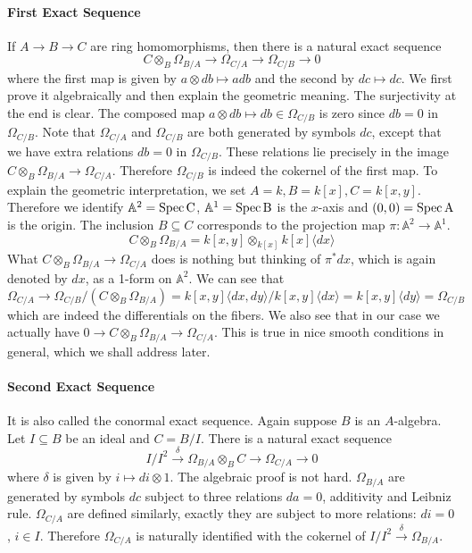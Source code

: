 \documentclass[12pt]{article}
\theoremstyle{plain}
\theoremstyle{definition}
\newcommand{\IA}{\mathbb{A}}
\newcommand{\Spec}{\rm Spec\,}
\newcommand\tensor{{\otimes}}
\newcommand{\<}{\langle}
\renewcommand{\>}{\rangle}
\newcommand{\Ohm}{\Omega}
\begin{document}
\paragraph{First Exact Sequence} If $A \to B \to C$ are ring homomorphisms, then there is a natural exact sequence 
$$ C \tensor_B \Ohm_{B/A} \to \Ohm_{C/A} \to \Ohm_{C/B} \to 0 $$
where the first map is given by $a \tensor db \mapsto a db$ and the second by $dc \mapsto dc$. We first prove it algebraically and then explain the geometric meaning. 
The surjectivity at the end is clear. The composed map $a \tensor db \mapsto db \in \Ohm_{C/B}$ is zero since $db = 0$ in $\Ohm_{C/B}$. Note that $\Ohm_{C/A}$ and $\Ohm_{C/B}$ are both generated by symbols $dc$, except that we have extra relations $db = 0$ in $\Ohm_{C/B}$. These relations lie precisely in the image $C \tensor_B \Ohm_{B/A} \to \Ohm_{C/A}$. Therefore $\Ohm_{C/B}$ is indeed the cokernel of the first map. To explain the geometric interpretation, we set $A = k, B = k[x], C = k[x, y]$. Therefore we identify $\IA^2 = \Spec C$, $\IA^1 = \Spec B$ is the $x$-axis and $(0, 0) = \Spec A$ is the origin. The inclusion $B \subseteq C$ corresponds to the projection map $\pi : \IA^2 \to \IA^1$. $$C \tensor_B \Ohm_{B/A} = k[x, y] \tensor_{k[x]} k[x] \< dx \> $$ What $C \tensor_B \Ohm_{B/A} \to \Ohm_{C/A}$ does is nothing but thinking of $\pi^* dx$, which is again denoted by $dx$, as a 1-form on $\IA^2$. We can see that 
$$\Ohm_{C/A} \to \Ohm_{C/B}/(C \tensor_B \Ohm_{B/A}) = k[x, y]\< dx, dy \> / k[x, y]\< dx \> = k[x, y] \< dy \> = \Ohm_{C/B}$$ 
which are indeed the differentials on the fibers. We also see that in our case we actually have $ 0 \to C \tensor_B \Ohm_{B/A} \to \Ohm_{C/A}$. This is true in nice smooth conditions in general, which we shall address later.


\paragraph{Second Exact Sequence} It is also called the conormal exact sequence. Again suppose $B$ is an $A$-algebra. Let $I \subseteq B$ be an ideal and $C = B/I$. There is a natural exact sequence 
$$ I/I^2 \stackrel{\delta}{\to} \Ohm_{B/A} \tensor_B C \to \Ohm_{C/A} \to 0 $$ where $\delta$ is given by $i \mapsto di \tensor 1$. 
The algebraic proof is not hard. $\Ohm_{B/A}$ are generated by symbols $dc$ subject to three relations $da = 0$, additivity and Leibniz rule. $\Ohm_{C/A}$ are defined similarly, exactly they are subject to more relations: $d i = 0$, $i \in I$. Therefore $\Ohm_{C/A}$ is naturally identified with the cokernel of $I/I^2 \stackrel{\delta}{\to} \Ohm_{B/A}$. 
\end{document}
